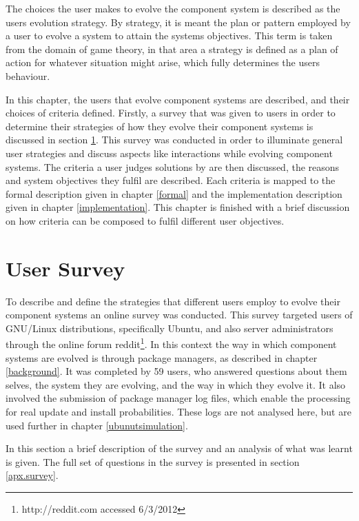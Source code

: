 The choices the user makes to evolve the component system is described as the users evolution strategy.
By strategy, it is meant the plan or pattern employed by a user to evolve a system to attain the systems objectives.
This term is taken from the domain of game theory, 
in that area a strategy is defined as a plan of action for whatever situation might arise, which fully determines the users behaviour.

In this chapter, the users that evolve component systems are described, and their choices of criteria defined.
Firstly, a survey that was given to users in order to determine their strategies of how they evolve their component systems is discussed in section \ref{strat.usersurvey}.
This survey was conducted in order to illuminate general user strategies and discuss aspects like interactions while evolving component systems.
The criteria a user judges solutions by are then discussed, the reasons and system objectives they fulfil are described.
Each criteria is mapped to the formal description given in chapter \ref{formal} and the implementation description given in chapter \ref{implementation}.
This chapter is finished with a brief discussion on how criteria can be composed to fulfil different user objectives. 

\section{User Survey}
\label{strat.usersurvey}
To describe and define the strategies that different users employ to evolve their component systems an online survey was conducted.
This survey targeted users of GNU/Linux distributions, specifically Ubuntu, and also server administrators through the online forum reddit\footnote{http://reddit.com accessed 6/3/2012}.
In this context the way in which component systems are evolved is through package managers, as described in chapter \ref{background}.
It was completed by 59 users, who answered questions about them selves, the system they are evolving, and the way in which they evolve it.
It also involved the submission of package manager log files, which enable the processing for real update and install probabilities.
These logs are not analysed here, but are used further in chapter \ref{ubunutsimulation}.

In this section a brief description of the survey and an analysis of what was learnt is given.
The full set of questions in the survey is presented in section \ref{apx.survey}. 

